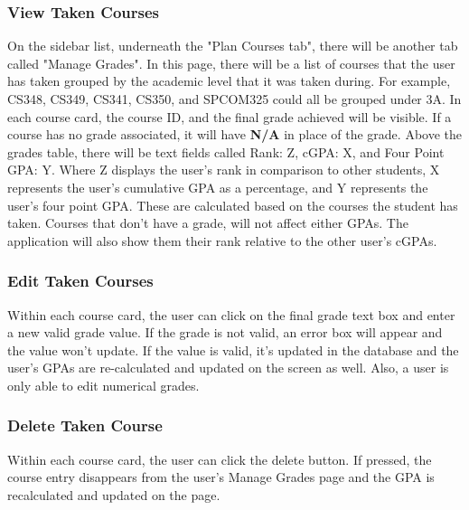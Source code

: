 \documentclass[12pt, a4paper]{article}
\begin{document}
\subsubsection*{View Taken Courses}
On the sidebar list, underneath the "Plan Courses tab", there will be another tab called "Manage Grades". In this page, there will be a list of courses that the user has taken grouped by the academic level that it was taken during. For example, CS348, CS349, CS341, CS350, and SPCOM325 could all be grouped under 3A. In each course card, the course ID, and the final grade achieved will be visible. If a course has no grade associated, it will have \textbf{N/A} in place of the grade. Above the grades table, there will be text fields called Rank: Z, cGPA: X, and Four Point GPA: Y. Where Z displays the user's rank in comparison to other students, X represents the user's cumulative GPA as a percentage, and Y represents the user's four point GPA. These are calculated based on the courses the student has taken. Courses that don't have a grade, will not affect either GPAs. The application will also show them their rank relative to the other user's cGPAs.
\subsubsection*{Edit Taken Courses}
Within each course card, the user can click on the final grade text box and enter a new valid grade value. If the grade is not valid, an error box will appear and the value won't update. If the value is valid, it's updated in the database and the user's GPAs are re-calculated and updated on the screen as well. Also, a user is only able to edit numerical grades.
\subsubsection*{Delete Taken Course}
Within each course card, the user can click the delete button. If pressed, the course entry disappears from the user's Manage Grades page and the GPA is recalculated and updated on the page.
\end{document}
